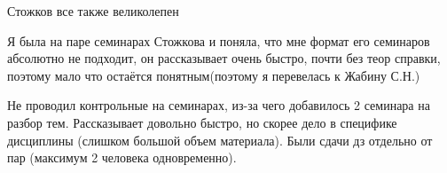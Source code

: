                 \begin{commentbox} 
                    Стожков все также великолепен 
                \end{commentbox} 

                \begin{commentbox} 
                    Я была на паре семинарах Стожкова и поняла, что мне формат его семинаров абсолютно не подходит, он рассказывает очень быстро, почти без теор справки, поэтому мало что остаётся понятным(поэтому я перевелась к Жабину С.Н.) 
                \end{commentbox} 

                \begin{commentbox} 
                    Не проводил контрольные на семинарах, из-за чего добавилось 2 семинара на разбор тем. Рассказывает довольно быстро, но скорее дело в специфике дисциплины (слишком большой объем материала). Были сдачи дз отдельно от пар (максимум 2 человека одновременно). 
                \end{commentbox} 

    
